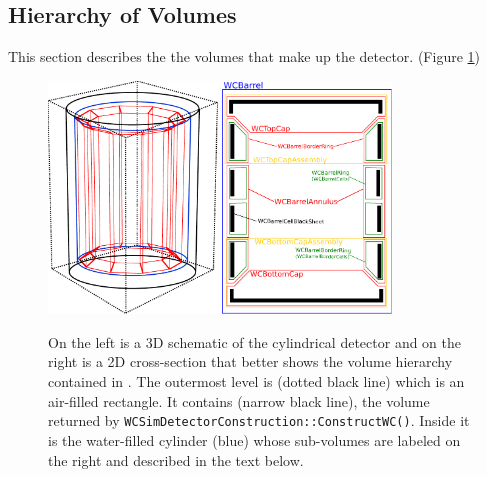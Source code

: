 \subsection{Hierarchy of Volumes}
This section describes the the volumes that make up the detector. (Figure \ref{fig:hi})
\begin{figure}[b!]
  \begin{center}
  \includegraphics[width=0.40\textwidth]{expHall2} 
  \hspace{0.1\textwidth}
  \includegraphics[width=0.40\textwidth]{annulus}
  \end{center}
  \caption{On the left is a 3D schematic of the cylindrical detector and on the right is a 2D cross-section that better shows the volume hierarchy contained in .  The outermost level is  (dotted black line) which is an air-filled rectangle.  It contains  (narrow black line), the volume returned by \texttt{WCSimDetectorConstruction::ConstructWC()}.  Inside it is the water-filled cylinder  (blue) whose sub-volumes are labeled on the right and described in the text below.}
\label{fig:hi}
\end{figure}


